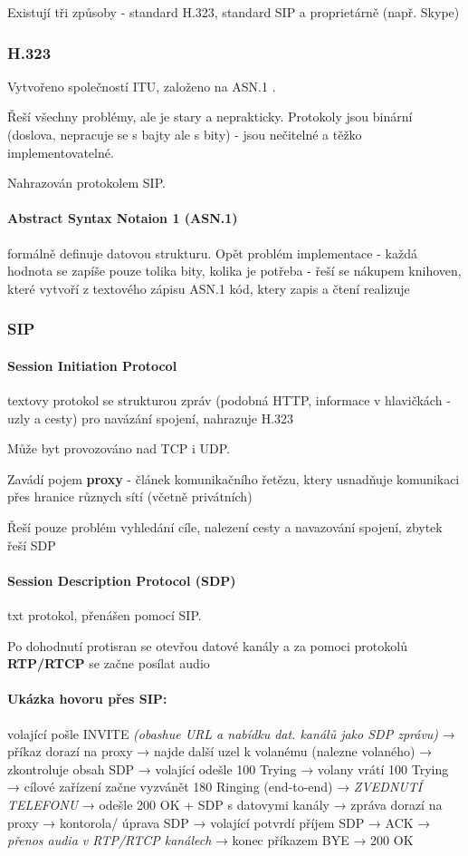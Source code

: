 \documentclass[10pt,a4paper]{article}
\begin{document}
Existují tři způsoby - standard H.323, standard SIP a proprietárně (např. Skype)

\subsubsection{H.323}

Vytvořeno společností ITU, založeno na ASN.1 .

Řeší všechny problémy, ale je stary a neprakticky. Protokoly jsou binární (doslova, nepracuje se s bajty ale s bity) - jsou nečitelné a těžko implementovatelné.

Nahrazován protokolem SIP.

\paragraph{Abstract Syntax Notaion 1 (ASN.1)} formálně definuje datovou strukturu. Opět problém implementace - každá hodnota se zapíše pouze tolika bity, kolika je potřeba - řeší se nákupem knihoven, které vytvoří z textového zápisu ASN.1 kód, ktery zapis a čtení realizuje

\subsubsection{SIP}

\paragraph{Session Initiation Protocol} textovy protokol se strukturou zpráv (podobná HTTP, informace v hlavičkách - uzly a cesty) pro navázání spojení, nahrazuje H.323

Může byt provozováno nad TCP i UDP.

Zavádí pojem \textbf{proxy} - článek komunikačního řetězu, ktery usnadňuje komunikaci přes hranice různych sítí (včetně privátních)

Řeší pouze problém vyhledání cíle, nalezení cesty a navazování spojení, zbytek řeší SDP

\paragraph{Session Description Protocol (SDP)} txt protokol, přenášen pomocí SIP.

Po dohodnutí protisran se otevřou datové kanály a za pomoci protokolů \textbf{RTP/RTCP} se začne posílat audio

\paragraph{Ukázka hovoru přes SIP:} volající pošle INVITE \textit{(obashue URL a nabídku dat. kanálů jako SDP zprávu)} → příkaz dorazí na proxy → najde další uzel k volanému (nalezne volaného) → zkontroluje obsah SDP → volající odešle 100 Trying → volany vrátí 100 Trying → cílové zařízení začne vyzvánět 180 Ringing (end-to-end) → \textit{ZVEDNUTÍ TELEFONU} → odešle 200 OK + SDP s datovymi kanály → zpráva dorazí na proxy → kontorola/ úprava SDP → volající potvrdí příjem SDP → ACK → \textit{přenos audia v RTP/RTCP kanálech} → konec příkazem BYE → 200 OK
\end{document}
